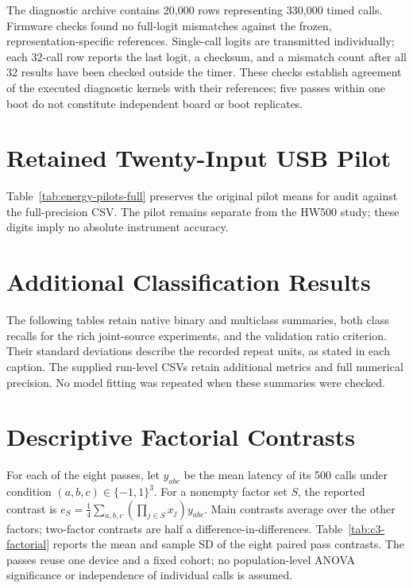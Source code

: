 \documentclass{ieeeaccess}
\begin{document}
The diagnostic archive contains 20,000 rows representing 330,000 timed calls. Firmware checks found no full-logit mismatches against the frozen, representation-specific references. Single-call logits are transmitted individually; each 32-call row reports the last logit, a checksum, and a mismatch count after all 32 results have been checked outside the timer. These checks establish agreement of the executed diagnostic kernels with their references; five passes within one boot do not constitute independent board or boot replicates.

\section{Retained Twenty-Input USB Pilot}
\label{app:energy-details}


Table~\ref{tab:energy-pilots-full} preserves the original pilot means for audit against the full-precision CSV. The pilot remains separate from the HW500 study; these digits imply no absolute instrument accuracy.


\section{Additional Classification Results}
\label{app:results}
The following tables retain native binary and multiclass summaries, both class recalls for the rich joint-source experiments, and the validation ratio criterion. Their standard deviations describe the recorded repeat units, as stated in each caption. The supplied run-level CSVs retain additional metrics and full numerical precision. No model fitting was repeated when these summaries were checked.


\raggedbottom
\section{Descriptive Factorial Contrasts}
\label{app:factorial}
For each of the eight passes, let $y_{abc}$ be the mean latency of its 500 calls under condition $(a,b,c)\in\{-1,1\}^3$. For a nonempty factor set $S$, the reported contrast is $e_S=\frac14\sum_{a,b,c}(\prod_{j\in S}x_j)y_{abc}$. Main contrasts average over the other factors; two-factor contrasts are half a difference-in-differences. Table~\ref{tab:c3-factorial} reports the mean and sample SD of the eight paired pass contrasts. The passes reuse one device and a fixed cohort; no population-level ANOVA significance or independence of individual calls is assumed.

\end{document}
